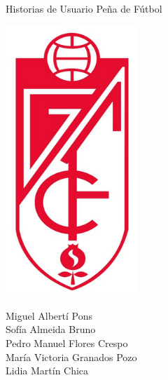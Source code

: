 \documentclass[11pt]{article}
\begin{document}
\begin{titlepage}
\centering
\vspace{4.5cm}
\scshape\LARGE{Historias de Usuario Peña de Fútbol\par}
\vspace{1.5cm}

\includegraphics[width=5cm]{escudoGR}

\vspace{1.5cm}
{\scshape\large \par}
\vspace{1cm}

{Miguel Albertí Pons\\
Sofía Almeida Bruno\\
Pedro Manuel Flores Crespo\\
María Victoria Granados Pozo\\
Lidia Martín Chica
\par}



\end{titlepage}
\newpage
\end{document}
